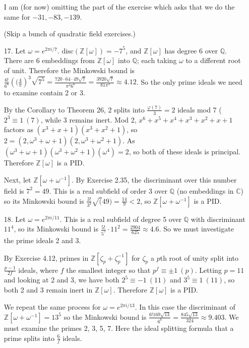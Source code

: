 \documentclass{article}
\newcommand{\w}[0]{\omega}
\newcommand{\z}[0]{\zeta}
\newcommand{\Q}[0]{\mathbb{Q}}
\newcommand{\C}[0]{\mathbb{C}}
\newcommand{\Z}[0]{\mathbb{Z}}
\newcommand{\disc}[1]{\text{disc}(#1)}
\newcommand{\modequiv}[3]{#1 \equiv #2\ (#3)}
\begin{document}
\begin{enumerate}
    I am (for now) omitting the part of the exercise which asks that we do the same for $-31, -83, -139$.

    (Skip a bunch of quadratic field exercises.)

    \item [17.] Let $\w = e^{2\pi i / 7}$.  $\disc{\Z[\w]} = -7^5$, and $\Z[\w]$ has degree 6 over $\Q$.  There are 6 embeddings from $\Z[\w]$ into $\Q$; each taking $\w$ to a different root of unit.  Therefore the Minkowski bound is $\frac{6!}{6^6}\left((\frac{4}{\pi}\right)^{3}\sqrt{7^5} = \frac{720 \cdot 64 \cdot 49\sqrt{7}}{\pi^3 6^6} = \frac{3920\sqrt{7}}{81\pi^3} \approx 4.12$.  So the only prime ideals we need to examine contain 2 or 3.

    By the Corollary to Theorem 26, $2$ splits into $\frac{\varphi(7)}{3} = 2$ ideals mod 7 ($\modequiv{2^3}{1}{7}$, while $3$ remains inert.  Mod 2, $x^6 + x^5 + x^4 + x^3 + x^2 + x + 1$ factors as $(x^3 + x + 1)(x^3 + x^2 + 1)$, so $2 = (2, \w^3 + \w + 1)(2, \w^3 + \w^2 + 1)$.  As $(\w^3 + \w + 1)(\w^3 + \w^2 + 1)(\w^4) = 2$, so both of these ideals is principal.  Therefore $\Z[\w]$ is a PID.

    Next, let $\Z[\w + \w^{-1}]$.  By Exercise 2.35, the discriminant over this number field is $7^{2} = 49$.  This is a real subfield of order 3 over $\Q$ (no embeddings in $\C$) so its Minkowski bound is $\frac{3!}{3^3}{\sqrt(49)} = \frac{14}{9} < 2$, so $\Z[\w + \w^{-1}]$ is a PID.

    \item[18.] Let $\w = e^{2\pi i / 11}$.
    This is a real subfield of degree 5 over $\Q$ with discriminant $11^{4}$, so its Minkowski bound is $\frac{5!}{5^5}\cdot 11^2 = \frac{2904}{625} \approx 4.6$.  So we must investigate the prime ideals 2 and 3.

    By Exercise 4.12, primes in $\Z[\z_{p} + \z_{p}^{-1}]$ for $\z_{p}$ a $p$th root of unity split into $\frac{p - 1}{2f}$ ideals, where $f$ the smallest integer so that $\modequiv{p^f}{\pm 1}{p}$.  Letting $p = 11$ and looking at 2 and 3, we have both $\modequiv{2^5}{-1}{11}$ and $\modequiv{3^5}{1}{11}$, so both 2 and 3 remain inert in $\Z[\w]$.  Therefore $\Z[\w]$ is a PID.

    We repeat the same process for $\w = e^{2\pi i / 13}$.  In this case the discriminant of $\Z[\w + \w^{-1}] = 13^{5}$ so the Minkowski bound is $\frac{6! 169 \sqrt{13}}{6^6} = \frac{845\sqrt{13}}{324} \approx 9.403$.  We must examine the primes 2, 3, 5, 7.  Here the ideal splitting formula that a prime splits into $\frac{6}{f}$ ideals.


\end{enumerate}
\end{document}

